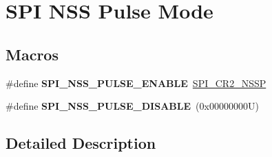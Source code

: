 \hypertarget{group___s_p_i___n_s_s_p___mode}{}\section{S\+PI N\+SS Pulse Mode}
\label{group___s_p_i___n_s_s_p___mode}
\subsection*{Macros}
\begin{DoxyCompactItemize}
\item 
\mbox{\label{group___s_p_i___n_s_s_p___mode_gac6243661f7fabde22ef936590f88be78}} 
\#define {\bfseries S\+P\+I\+\_\+\+N\+S\+S\+\_\+\+P\+U\+L\+S\+E\+\_\+\+E\+N\+A\+B\+LE}~\hyperlink{group___peripheral___registers___bits___definition_ga2e7d9d05424a68e6b02b82280541dbd2}{S\+P\+I\+\_\+\+C\+R2\+\_\+\+N\+S\+SP}
\item 
\mbox{\label{group___s_p_i___n_s_s_p___mode_ga34736b4ea038be7723b31a0416a26832}} 
\#define {\bfseries S\+P\+I\+\_\+\+N\+S\+S\+\_\+\+P\+U\+L\+S\+E\+\_\+\+D\+I\+S\+A\+B\+LE}~(0x00000000\+U)
\end{DoxyCompactItemize}


\subsection{Detailed Description}
